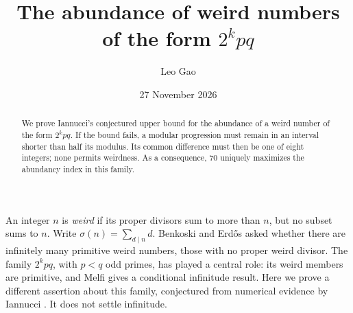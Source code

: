 \documentclass[11pt]{article}
\title{The abundance of weird numbers of the form \(2^kpq\)}
\author{Leo Gao}
\date{27 November 2026}
\begin{document}
\maketitle
\begin{abstract}
We prove Iannucci's conjectured upper bound for the abundance of a weird number of the form \(2^kpq\). If the bound fails, a modular progression must remain in an interval shorter than half its modulus. Its common difference must then be one of eight integers; none permits weirdness. As a consequence, \(70\) uniquely maximizes the abundancy index in this family.
\end{abstract}

An integer \(n\) is \emph{weird} if its proper divisors sum to more than \(n\), but no subset sums to \(n\). Write \(\sigma(n)=\sum_{d\mid n}d\). Benkoski and Erd\H os \cite{BE} asked whether there are infinitely many primitive weird numbers, those with no proper weird divisor. The family \(2^kpq\), with \(p<q\) odd primes, has played a central role: its weird members are primitive, and Melfi \cite{M} gives a conditional infinitude result. Here we prove a different assertion about this family, conjectured from numerical evidence by Iannucci \cite[\S III, (6)]{I}. It does not settle infinitude.
\end{document}
